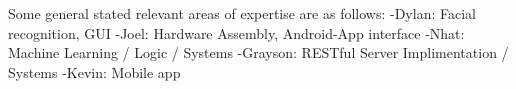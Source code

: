 Some general stated relevant areas of expertise are as follows:\newline
-Dylan: Facial recognition, GUI\newline
-Joel: Hardware Assembly, Android-App interface\newline
-Nhat: Machine Learning / Logic / Systems \newline
-Grayson: RESTful Server Implimentation / Systems \newline
-Kevin: Mobile app